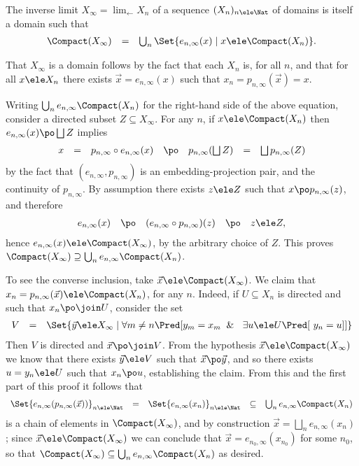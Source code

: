 \documentclass{lmcs}
\newcommand{\vect}[1]{\vec{#1}}
\begin{document}
 \begin{prop} \label{prop:compactXinfty}
The inverse limit $X_\infty = \lim_\leftarrow X_n$ of a sequence $(X_n)_{n\ele \Nat}$ of domains is itself a domain such that
%
 \[ \begin{array}{rcl}
\Compact(X_\infty) 
	&=& 
\bigcup_n \Set{e_{n,\infty}(x) \mid x \ele \Compact(X_n)}.
 \end{array} \]
 \end{prop}

 \begin{Proof} That $X_\infty$ is a domain follows by the fact that each $X_n$ is, for all $n$, and that for all $x\ele X_n$ there exists $\vect{x} = e_{n,\infty}(x)$ such that $x_n = p_{n,\infty}(\vect{x}) = x$.

Writing $\bigcup_n e_{n,\infty} \Compact(X_n)$ for the right-hand side of the above equation, consider a directed subset $Z\subseteq X_\infty$.
For any $n$, if $x \ele \Compact(X_n)$ then $e_{n,\infty}(x) \po \bigsqcup Z$ implies
%
 \[ \begin{array}{rcl@{\quad}lccc}
x 
	&=& 
p_{n,\infty} \circ e_{n,\infty}(x) 
	&\po& 
p_{n,\infty}(\bigsqcup Z) 
	&=& 
\bigsqcup p_{n,\infty}(Z)
 \end{array} \]
by the fact that $(e_{n,\infty},p_{n,\infty})$ is an embedding-projection pair, and the continuity of $p_{n,\infty}$. By assumption there exists $z\ele Z$ such that $x \po p_{n,\infty}(z)$, and therefore 
%
 \[ \begin{array}{rcl@{\quad}lccc}
e_{n,\infty}(x) &\po& (e_{n,\infty}\circ p_{n,\infty})(z) &\po& z \ele Z ,
 \end{array} \] 
hence $e_{n,\infty}(x) \ele \Compact(X_\infty)$, by the arbitrary choice of $Z$. 
This proves $\Compact(X_\infty) \supseteq\bigcup_n e_{n,\infty} \Compact(X_n)$.

To see the converse inclusion, take $\vect{x} \ele \Compact(X_\infty)$. 
We claim that $x_n = p_{n,\infty}(\vect{x}) \ele \Compact(X_n)$, for any $n$. 
Indeed, if $U\subseteq X_n$ is directed and such that $x_n \po \join U$, consider the set 
%
 \[ \begin{array}{rcl}
V &=& \Set{ \vect{y} \ele X_\infty \mid \forall m\neq n \Pred[{ y_m = x_m \And\ \exists u \ele U \Pred[ \ y_n = u ] }] }
 \end{array} \]
Then $V$ is directed and $\vect{x} \po \join V$. 
From the hypothesis $\vect{x} \ele \Compact(X_\infty)$ we know that there exists $\vect{y} \ele V$ such that $\vect{x} \po\vect{y}$, and so there exists $u = y_n \ele U$ such that $x_n \po u$, establishing the claim. 
From this and the first part of this proof it follows that 
%
 \[ \begin{array}{rclcl}
\Set{e_{n,\infty}(p_{n,\infty}(\vect{x}))}_{n\ele \Nat} &=& \Set{e_{n,\infty}(x_n)}_{n\ele \Nat} &\subseteq& \bigcup_n e_{n,\infty} \Compact(X_n)
 \end{array} \] 
is a chain of elements in $\Compact(X_\infty)$, and by construction
$\vect{x} = \bigsqcup_n e_{n,\infty}(x_n)$; since $\vect{x} \ele \Compact(X_\infty)$ we can conclude that $\vect{x} = e_{n_0,\infty}(x_{n_0})$ for some $n_0$, so that $\Compact(X_\infty) \subseteq\bigcup_n e_{n,\infty} \Compact(X_n)$ as desired.
 \end{Proof}
\end{document}
